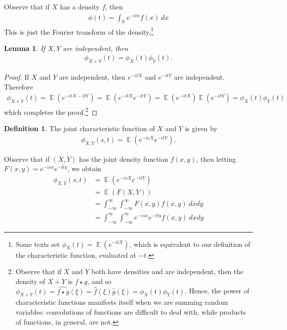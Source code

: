 \documentclass[12pt]{amsbook}
\newcommand{\rr}{\mathbb{R}}
\newcommand{\wh}{\widehat}
\DeclareMathOperator{\ex}{\mathbb{E}}
\theoremstyle{plain}
\newtheorem{lemma}[theorem]{Lemma}
\theoremstyle{definition}
\newtheorem*{definition}{Definition}
\theoremstyle{remark}
\numberwithin{equation}{section}  %
\numberwithin{equation}{section}  %
\begin{document}
	Observe that if $X$ has a density $f$, then
	\begin{equation*}
		\begin{split}
			\phi(t) = \int_{\rr} e^{-itx} f(x) \ dx
		\end{split}
	\end{equation*}
	This is just the Fourier transform of the density.\footnote{ 
		Some texts set $\phi_{X}(t) = \ex(e^{-itX})$,
		which is equivalent to our definition
	of the characteristic function, evaluated at $-t$.} 
	\begin{lemma}\label{lem:indep}
		If $X, Y$ are independent, then
		\begin{equation*}
			\begin{split}
				\phi_{X + Y}(t) = \phi_{X}(t) \phi_{Y}(t).
			\end{split}
		\end{equation*}
	\end{lemma}
	\begin{proof}
		If $X$ and $Y$ are independent, then $e^{-itX}$ and $e^{-itY}$ are independent.
		Therefore
		\begin{equation*}
			\begin{split}
				\phi_{X + Y}(t) = \ex(e^{-itX - itY}) = \ex(e^{-itX} e^{-itY})
				= \ex(e^{-itX}) \ex (e^{-itY}) = \phi_{X}(t) \phi_{Y}(t)
			\end{split}
		\end{equation*}
		which completes the proof.\footnote{
			Observe that if $X$ and $Y$ both have densities and are independent, then 
			the density of $X + Y$ is $f \star g$, and so 
			$\phi_{X + Y}(t) = \wh{f \star g}(\xi) = \wh{f}(\xi) \wh{g}(\xi) =
			\phi_{X}(t) \phi_{Y}(t).$ Hence, the power of characteristic functions
			manifests itself when we are summing random variables: convolutions of
			functions are difficult to deal with, while products of functions, in general,
		are not.}
	\end{proof}
	\begin{definition}
		The joint characteristic function of $X$ and $Y$ is given by
		\begin{equation*}
			\begin{split}
				\phi_{X,Y}(s,t) = \ex(e^{-isX} e^{-itY}).
			\end{split}
		\end{equation*}
	\end{definition}
	Observe that if $(X, Y)$ has the joint density function $f(x, y)$, then
	letting $F(x, y) = e^{-isx} e^{-ity}$, we obtain
	\begin{equation*}
		\begin{split}
			\phi_{X,Y}(s,t) & = \ex(e^{-isX} e^{-itY})
			\\
			& = \ex(F(X, Y))
			\\
			& = \int_{-\infty}^{\infty}\int_{-\infty}^{\infty} F(x, y) f(x, y) \ dx  dy
			\\
			& = \int_{-\infty}^{\infty}\int_{-\infty}^{\infty} e^{-isx} e^{-ity}
			f(x, y) \ dx  dy
		\end{split}
	\end{equation*}
\end{document}
